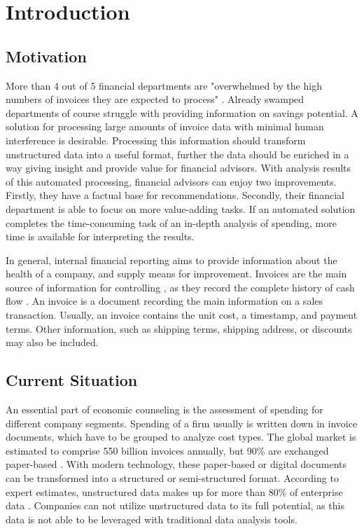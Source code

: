 \chapter{Introduction}
\section{Motivation}

More than 4 out of 5 financial departments are "overwhelmed by the high numbers of invoices they are expected to process"  \cite{manualInvoiceProcessing}. Already swamped departments of course struggle with providing information on savings potential. A solution for processing large amounts of invoice data with minimal human interference is desirable. Processing this information should transform unstructured data into a useful format, further the data should be enriched in a way giving insight and provide value for financial advisors. With analysis results of this automated processing, financial advisors can enjoy two improvements. Firstly, they have a factual base for recommendations. Secondly, their financial department is able to focus on more value-adding tasks. If an automated solution completes the time-consuming task of an in-depth analysis of spending, more time is available for interpreting the results.

In general, internal financial reporting aims to provide information about the health of a company, and supply means for improvement. Invoices are the main source of information for controlling \cite{investopediaInvoices}, as they record the complete history of cash flow \cite{invoicesPurpose}. An invoice is a document recording the main information on a sales transaction. Usually, an invoice contains the unit cost, a timestamp, and payment terms. Other information, such as shipping terms, shipping address, or discounts may also be included. 

\section{Current Situation}
An essential part of economic counseling is the assessment of spending for different company segments. Spending of a firm usually is written down in invoice documents, which have to be grouped  to analyze cost types.
The global market is estimated to comprise 550 billion invoices annually, but 90\% are exchanged paper-based \cite{kochEInvoicingJourney}. With modern technology, these paper-based or digital documents can be transformed into a structured or semi-structured format. According to expert estimates, unstructured data makes up for more than 80\% of enterprise data \cite{structuredAndUnstructuredData}. Companies can not utilize unstructured data to its full potential, as this data is not able to be leveraged with traditional data analysis tools.

